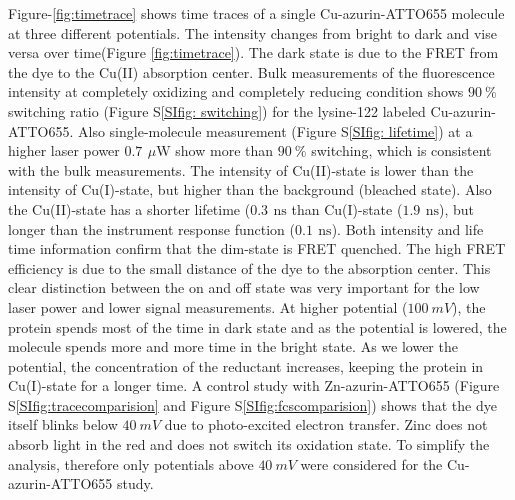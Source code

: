 \documentclass[journal=jacsat,manuscript=article]{achemso}
\newcommand{\uW}{\ensuremath{\,\mu\textrm{W}}}
\newcommand{\ns}{\ensuremath{\,\textrm{ns}}}
\begin{document}
Figure-\ref{fig:timetrace} shows time traces of a single Cu-azurin-ATTO655 molecule at three different potentials. The intensity changes from bright to dark and vise versa over time(Figure \ref{fig:timetrace}). The dark state is due to the FRET from the dye to the Cu(II) absorption center\cite{kuznetsova2006a}. Bulk measurements of the fluorescence intensity at completely oxidizing and completely reducing condition shows $90~$\% switching ratio (Figure S\ref{SIfig: switching}) for the lysine-122 labeled Cu-azurin-ATTO655.\cite{nicolardi2012topdown} Also single-molecule measurement (Figure S\ref{SIfig: lifetime}) at a higher laser power $0.7~\uW$ show more than $90~\%$ switching, which is consistent with the bulk measurements. The intensity of Cu(II)-state is lower than the intensity of Cu(I)-state, but higher than the background (bleached state). Also the Cu(II)-state has a shorter lifetime ($0.3~\ns$ than Cu(I)-state ($1.9~\ns$), but longer than the instrument response function ($0.1~\ns$). Both intensity and life time information confirm that the dim-state is FRET quenched. The high FRET efficiency is due to the small distance of the dye to the absorption center. This clear distinction between the on and off state was very important for the low laser power and lower signal measurements. At higher potential ($100~mV$), the protein spends most of the time in dark state and as the potential is lowered, the molecule spends more and more time in the bright state. As we lower the potential, the concentration of the reductant increases, keeping the protein in Cu(I)-state for a longer time. A control study with Zn-azurin-ATTO655 (Figure S\ref{SIfig:tracecomparision} and Figure S\ref{SIfig:fcscomparision}) shows that the dye itself blinks below $40~mV$ due to photo-excited electron transfer. Zinc does not absorb light in the red and does not switch its oxidation state. To simplify the analysis, therefore only potentials above $40~mV$ were considered for the Cu-azurin-ATTO655 study.\\
\end{document}
